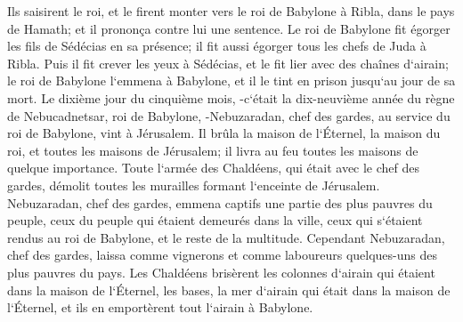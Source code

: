 \verse Ils saisirent le roi, et le firent monter vers le roi de Babylone à Ribla, dans le pays de Hamath; et il prononça contre lui une sentence. 
\verse Le roi de Babylone fit égorger les fils de Sédécias en sa présence; il fit aussi égorger tous les chefs de Juda à Ribla. 
\verse Puis il fit crever les yeux à Sédécias, et le fit lier avec des chaînes d`airain; le roi de Babylone l`emmena à Babylone, et il le tint en prison jusqu`au jour de sa mort. 
\verse Le dixième jour du cinquième mois, -c`était la dix-neuvième année du règne de Nebucadnetsar, roi de Babylone, -Nebuzaradan, chef des gardes, au service du roi de Babylone, vint à Jérusalem. 
\verse Il brûla la maison de l`Éternel, la maison du roi, et toutes les maisons de Jérusalem; il livra au feu toutes les maisons de quelque importance. 
\verse Toute l`armée des Chaldéens, qui était avec le chef des gardes, démolit toutes les murailles formant l`enceinte de Jérusalem. 
\verse Nebuzaradan, chef des gardes, emmena captifs une partie des plus pauvres du peuple, ceux du peuple qui étaient demeurés dans la ville, ceux qui s`étaient rendus au roi de Babylone, et le reste de la multitude. 
\verse Cependant Nebuzaradan, chef des gardes, laissa comme vignerons et comme laboureurs quelques-uns des plus pauvres du pays. 
\verse Les Chaldéens brisèrent les colonnes d`airain qui étaient dans la maison de l`Éternel, les bases, la mer d`airain qui était dans la maison de l`Éternel, et ils en emportèrent tout l`airain à Babylone. 
